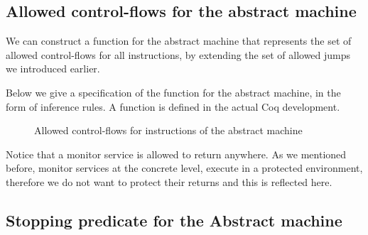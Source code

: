 \subsection{Allowed control-flows for the abstract machine}
\label{sec:abstract_flow}

We can construct a function  for the abstract machine
that represents the set of allowed control-flows for all
instructions, by extending the set of allowed jumps \CFG we
introduced earlier.

Below we give a specification of the  function for the abstract machine,
in the form of inference rules.
A function is defined in the actual Coq development.

\begin{figure}[htbp]
\bigskip

\bigskip

\bigskip

\caption{Allowed control-flows for instructions of the abstract machine}
\end{figure}

Notice that a monitor service is allowed to return anywhere. As we
mentioned before, monitor services at the concrete level, execute in a
protected environment, therefore we do not want to protect their
returns and this is reflected here.

\subsection{Stopping predicate for the Abstract machine}
\label{sec:abstract_stopping}

